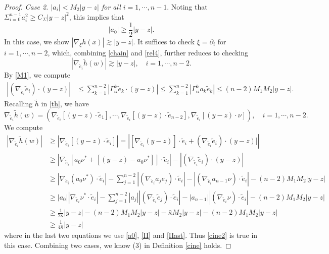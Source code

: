 \documentclass[10pt,a4paper]{amsart}
\begin{document}
\begin{proof}
\medskip
\emph{Case 2. $|a_i| < M_2|y-z|$ for all $i=1,\cdots, n-1$}. Noting that $\Sigma_{i=0}^{n-1}a_i^2 \ge C_\Sigma |y-z|^2$, this implies that
\begin{equation}\label{a0}
  |a_0| \ge \frac12|y-z|.
\end{equation}
In this case, we show $|\nabla_\xi h(x)|\gtrsim |y-z|$. It suffices to check $\xi = \partial_i$ for $i=1, \cdots, n-2$, which, combining \eqref{chain} and \eqref{rel4}, further reduces to checking
$$   |\nabla_{\tilde e_i} \tilde h(w)|\gtrsim |y-z|, \quad  i= 1, \cdots,  n-2.   $$
By \eqref{M1}, we compute
\begin{align*}
  |(\nabla_{\tilde e_i}\tilde e_i)\cdot (y-z)| & \le \sum_{k=1}^{n-2} |\Gamma_{ii}^k \tilde e_k \cdot  (y-z)| \le \sum_{k=1}^{n-2} |\Gamma_{ii}^k a_k \tilde e_k| \le (n-2)M_1M_2|y-z|.
\end{align*}
Recalling $\tilde h$ in \eqref{th},
we have
\begin{equation*}
\nabla_{\tilde e_i} \tilde h (w)= (\nabla_{\tilde e_i}[(y-z) \cdot \tilde e_1], \cdots, \nabla_{\tilde e_i}[(y-z) \cdot \tilde e_{n-2}], \nabla_{\tilde e_i}[ (y-z) \cdot\nu]), \quad i=1, \cdots, n-2.
\end{equation*}
We compute
\begin{align*}
  |\nabla_{\tilde e_i} \tilde h(w)| & \ge |\nabla_{\tilde e_i}[(y-z) \cdot \tilde e_i]| =|[\nabla_{\tilde e_i}(y-z)]\cdot \tilde e_i + (\nabla_{\tilde e_i}\tilde e_i)\cdot (y-z)]|  \\
   & \ge  |\nabla_{\tilde e_i}[a_0\nu^\ast+[(y-z)-a_0\nu^\ast]]\cdot \tilde e_i| - |(\nabla_{\tilde e_i}\tilde e_i)\cdot(y-z)| \\
   & \ge |\nabla_{\tilde e_i}(a_0\nu^\ast)\cdot  \tilde e_i| - \sum_{j=1}^{n-2}|(\nabla_{\tilde e_i}a_je_j) \cdot \tilde e_i|- |(\nabla_{\tilde e_i}a_{n-1}\nu) \cdot \tilde e_i| - (n-2)M_1M_2|y-z|\\
   & \ge |a_0||\nabla_{\tilde e_i}\nu^\ast \cdot \tilde e_i| - \sum_{j=1}^{n-2}|a_j||(\nabla_{\tilde e_i}\tilde e_j) \cdot \tilde e_i| -|a_{n-1}||(\nabla_{\tilde e_i}\nu) \cdot \tilde e_i| - (n-2)M_1M_2|y-z|  \\
   & \ge \frac{1}{2 \bar \kappa}|y-z| - (n-2)M_1M_2 |y-z|- \bar \kappa M_2 |y-z| -(n-2)M_1M_2|y-z| \\
   & \ge \frac{1}{4 \bar \kappa}|y-z|
\end{align*}
where in the last two equations we use \eqref{a0}, \eqref{II} and \eqref{IIast}.
Thus \eqref{cine2} is true in this case. Combining two cases, we know (3) in Definition \ref{cine} holds.





\end{proof}
\end{document}

